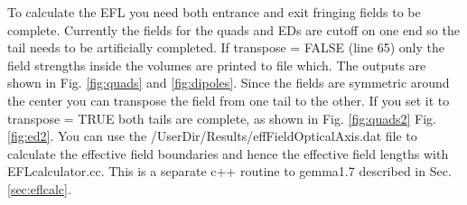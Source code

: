 \documentclass[letter,11pt]{article}
\newcommand{\filefont}[1]{{\scriptsize\ttfamily\selectfont #1}\xspace}
\begin{document}
To calculate the EFL you need both entrance and exit fringing fields to be complete. Currently the fields for the quads and EDs are cutoff on one end so the tail needs to be artificially completed. If \filefont{transpose = FALSE} (line 65) only the field strengths inside the volumes are printed to file which. The outputs are shown in Fig. \ref{fig:quads} and \ref{fig:dipoles}. Since the fields are symmetric around the center you can transpose the field from one tail to the other. If you set it to \filefont{transpose = TRUE} both tails are complete, as shown in Fig. \ref{fig:quads2} Fig. \ref{fig:ed2}. You can use the /UserDir/Results/effFieldOpticalAxis.dat file to calculate the effective field boundaries and hence the effective field lengths with EFLcalculator.cc. This is a separate c++ routine to gemma1.7 described in Sec. \ref{sec:eflcalc}.
\end{document}
